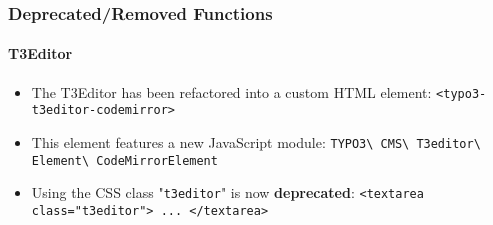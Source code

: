 %

\begin{frame}[fragile]
	\frametitle{Deprecated/Removed Functions}
	\framesubtitle{T3Editor}

	\begin{itemize}
		\item The T3Editor has been refactored into a custom HTML element:\newline
			\smaller\texttt{<typo3-t3editor-codemirror>}\normalsize

		\item This element features a new JavaScript module:\newline
			\small
				\texttt{TYPO3\textbackslash
					CMS\textbackslash
					T3editor\textbackslash
					Element\textbackslash
					CodeMirrorElement}
			\normalsize

		\item Using the CSS class "\texttt{t3editor}" is now \textbf{deprecated}:\newline
			\smaller\texttt{<textarea class="t3editor"> ... </textarea>}\normalsize

	\end{itemize}

\end{frame}

